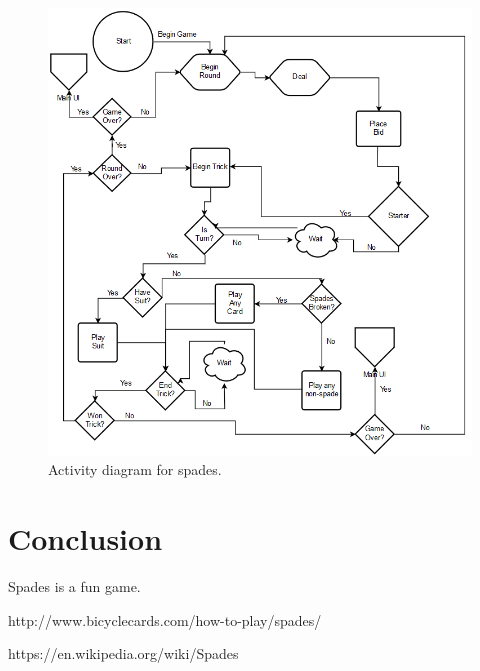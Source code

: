 \documentclass[journal, a4paper]{IEEEtran}
\begin{document}
		\begin{figure}[!hbt]
		\begin{center}
		\includegraphics[width=\columnwidth]{logicDiagram}
		\caption{Activity diagram for spades.}
		\label{Figure 1}
		\end{center}
	\end{figure}
	

\section{Conclusion}
	Spades is a fun game. 

\begin{thebibliography}{5}

	http://www.bicyclecards.com/how-to-play/spades/ 

	https://en.wikipedia.org/wiki/Spades

\end{thebibliography}

\end{document}

